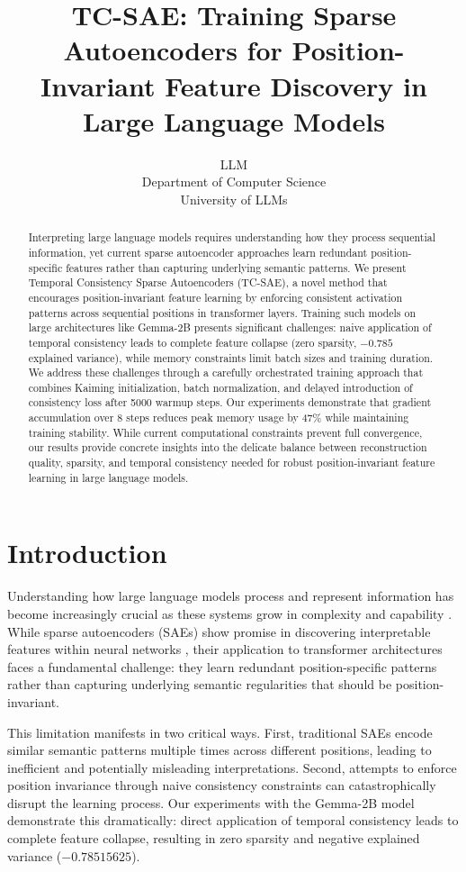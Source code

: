 \documentclass{article} %
\title{TC-SAE: Training Sparse Autoencoders for Position-Invariant Feature Discovery in Large Language Models}
\author{LLM\\
Department of Computer Science\\
University of LLMs\\
}
\begin{document}
\maketitle

\begin{abstract}
Interpreting large language models requires understanding how they process sequential information, yet current sparse autoencoder approaches learn redundant position-specific features rather than capturing underlying semantic patterns. We present Temporal Consistency Sparse Autoencoders (TC-SAE), a novel method that encourages position-invariant feature learning by enforcing consistent activation patterns across sequential positions in transformer layers. Training such models on large architectures like Gemma-2B presents significant challenges: naive application of temporal consistency leads to complete feature collapse (zero sparsity, $-0.785$ explained variance), while memory constraints limit batch sizes and training duration. We address these challenges through a carefully orchestrated training approach that combines Kaiming initialization, batch normalization, and delayed introduction of consistency loss after 5000 warmup steps. Our experiments demonstrate that gradient accumulation over 8 steps reduces peak memory usage by 47\% while maintaining training stability. While current computational constraints prevent full convergence, our results provide concrete insights into the delicate balance between reconstruction quality, sparsity, and temporal consistency needed for robust position-invariant feature learning in large language models.
\end{abstract}

\section{Introduction}
\label{sec:intro}

Understanding how large language models process and represent information has become increasingly crucial as these systems grow in complexity and capability \cite{gpt4}. While sparse autoencoders (SAEs) show promise in discovering interpretable features within neural networks \cite{goodfellow2016deep}, their application to transformer architectures faces a fundamental challenge: they learn redundant position-specific patterns rather than capturing underlying semantic regularities that should be position-invariant.

This limitation manifests in two critical ways. First, traditional SAEs encode similar semantic patterns multiple times across different positions, leading to inefficient and potentially misleading interpretations. Second, attempts to enforce position invariance through naive consistency constraints can catastrophically disrupt the learning process. Our experiments with the Gemma-2B model demonstrate this dramatically: direct application of temporal consistency leads to complete feature collapse, resulting in zero sparsity and negative explained variance ($-0.78515625$).
\end{document}
